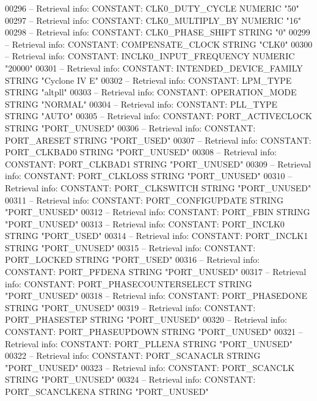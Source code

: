 \begin{DoxyCode}
{00296 \textcolor{keyword}{-- Retrieval info: CONSTANT: CLK0\_DUTY\_CYCLE NUMERIC "50"}
00297 \textcolor{keyword}{-- Retrieval info: CONSTANT: CLK0\_MULTIPLY\_BY NUMERIC "16"}
00298 \textcolor{keyword}{-- Retrieval info: CONSTANT: CLK0\_PHASE\_SHIFT STRING "0"}
00299 \textcolor{keyword}{-- Retrieval info: CONSTANT: COMPENSATE\_CLOCK STRING "CLK0"}
00300 \textcolor{keyword}{-- Retrieval info: CONSTANT: INCLK0\_INPUT\_FREQUENCY NUMERIC "20000"}
00301 \textcolor{keyword}{-- Retrieval info: CONSTANT: INTENDED\_DEVICE\_FAMILY STRING "Cyclone IV E"}
00302 \textcolor{keyword}{-- Retrieval info: CONSTANT: LPM\_TYPE STRING "altpll"}
00303 \textcolor{keyword}{-- Retrieval info: CONSTANT: OPERATION\_MODE STRING "NORMAL"}
00304 \textcolor{keyword}{-- Retrieval info: CONSTANT: PLL\_TYPE STRING "AUTO"}
00305 \textcolor{keyword}{-- Retrieval info: CONSTANT: PORT\_ACTIVECLOCK STRING "PORT\_UNUSED"}
00306 \textcolor{keyword}{-- Retrieval info: CONSTANT: PORT\_ARESET STRING "PORT\_USED"}
00307 \textcolor{keyword}{-- Retrieval info: CONSTANT: PORT\_CLKBAD0 STRING "PORT\_UNUSED"}
00308 \textcolor{keyword}{-- Retrieval info: CONSTANT: PORT\_CLKBAD1 STRING "PORT\_UNUSED"}
00309 \textcolor{keyword}{-- Retrieval info: CONSTANT: PORT\_CLKLOSS STRING "PORT\_UNUSED"}
00310 \textcolor{keyword}{-- Retrieval info: CONSTANT: PORT\_CLKSWITCH STRING "PORT\_UNUSED"}
00311 \textcolor{keyword}{-- Retrieval info: CONSTANT: PORT\_CONFIGUPDATE STRING "PORT\_UNUSED"}
00312 \textcolor{keyword}{-- Retrieval info: CONSTANT: PORT\_FBIN STRING "PORT\_UNUSED"}
00313 \textcolor{keyword}{-- Retrieval info: CONSTANT: PORT\_INCLK0 STRING "PORT\_USED"}
00314 \textcolor{keyword}{-- Retrieval info: CONSTANT: PORT\_INCLK1 STRING "PORT\_UNUSED"}
00315 \textcolor{keyword}{-- Retrieval info: CONSTANT: PORT\_LOCKED STRING "PORT\_USED"}
00316 \textcolor{keyword}{-- Retrieval info: CONSTANT: PORT\_PFDENA STRING "PORT\_UNUSED"}
00317 \textcolor{keyword}{-- Retrieval info: CONSTANT: PORT\_PHASECOUNTERSELECT STRING "PORT\_UNUSED"}
00318 \textcolor{keyword}{-- Retrieval info: CONSTANT: PORT\_PHASEDONE STRING "PORT\_UNUSED"}
00319 \textcolor{keyword}{-- Retrieval info: CONSTANT: PORT\_PHASESTEP STRING "PORT\_UNUSED"}
00320 \textcolor{keyword}{-- Retrieval info: CONSTANT: PORT\_PHASEUPDOWN STRING "PORT\_UNUSED"}
00321 \textcolor{keyword}{-- Retrieval info: CONSTANT: PORT\_PLLENA STRING "PORT\_UNUSED"}
00322 \textcolor{keyword}{-- Retrieval info: CONSTANT: PORT\_SCANACLR STRING "PORT\_UNUSED"}
00323 \textcolor{keyword}{-- Retrieval info: CONSTANT: PORT\_SCANCLK STRING "PORT\_UNUSED"}
00324 \textcolor{keyword}{-- Retrieval info: CONSTANT: PORT\_SCANCLKENA STRING "PORT\_UNUSED"}
}
\end{DoxyCode}
